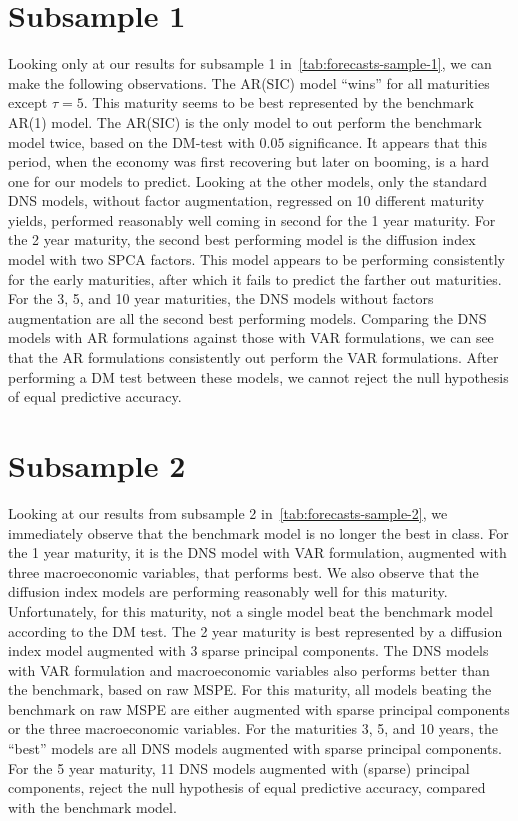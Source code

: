 \section{Subsample 1}
Looking only at our results for subsample 1 in~\cref{tab:forecasts-sample-1}, we can make the following observations. 
The AR(SIC) model \enquote{wins} for all maturities except $\tau = 5$. 
This maturity seems to be best represented by the benchmark AR(1) model.
The AR(SIC) is the only model to out perform the benchmark model twice, based on the DM-test with $0.05$ significance. 
It appears that this period, when the economy was first recovering but later on booming, is a hard one for our models to predict. 
Looking at the other models, only the standard DNS models, without factor augmentation, regressed on 10 different maturity yields, performed reasonably well coming in second for the 1 year maturity. 
For the 2 year maturity, the second best performing model is the diffusion index model with two SPCA factors. 
This model appears to be performing consistently for the early maturities, after which it fails to predict the farther out maturities. 
For the 3, 5, and 10 year maturities, the DNS models without factors augmentation are all the second best performing models. 
Comparing the DNS models with AR formulations against those with VAR formulations, we can see that the AR formulations consistently out perform the VAR formulations. 
After performing a DM test between these models, we cannot reject the null hypothesis of equal predictive accuracy. 

\section{Subsample 2}
Looking at our results from subsample 2 in~\cref{tab:forecasts-sample-2}, we immediately observe that the benchmark model is no longer the best in class. 
For the 1 year maturity, it is the DNS model with VAR formulation, augmented with three macroeconomic variables, that performs best. 
We also observe that the diffusion index models are performing reasonably well for this maturity. 
Unfortunately, for this maturity, not a single model beat the benchmark model according to the DM test. 
The 2 year maturity is best represented by a diffusion index model augmented with 3 sparse principal components. 
The DNS models with VAR formulation and macroeconomic variables also performs better than the benchmark, based on raw MSPE.
For this maturity, all models beating the benchmark on raw MSPE are either augmented with sparse principal components or the three macroeconomic variables.
For the maturities 3, 5, and 10 years, the \enquote{best} models are all DNS models augmented with sparse principal components. 
For the 5 year maturity, 11 DNS models augmented with (sparse) principal components, reject the null hypothesis of equal predictive accuracy, compared with the benchmark model. 

